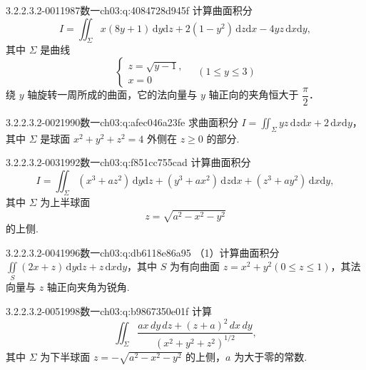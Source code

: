 \par\addvspace{2.4ex}\noindent
\begin{minipage}{\linewidth}

\begin{q}{3.2.2.3.2-001}{1987数一}{ch03:q:4084728d945f}
计算曲面积分
\[
I=\iint_{\Sigma} x(8y+1)\,\mathrm{d}y\mathrm{d}z+2(1-y^{2})\,\mathrm{d}z\mathrm{d}x-4yz\,\mathrm{d}x\mathrm{d}y,
\]
其中 $\Sigma$ 是曲线
\[
\begin{cases}
z=\sqrt{y-1},\\
x=0
\end{cases}\quad (1\leqslant y\leqslant 3)
\]
绕 $y$ 轴旋转一周所成的曲面，它的法向量与 $y$ 轴正向的夹角恒大于 $\dfrac{\pi}{2}$．
\end{q}
\end{minipage}


\begin{q}{3.2.2.3.2-002}{1990数一}{ch03:q:afec046a23fe}
求曲面积分 $\displaystyle I=\iint_{\Sigma} yz\,\mathrm{d}z\mathrm{d}x+2\,\mathrm{d}x\mathrm{d}y$，其中 $\Sigma$ 是球面 $x^2+y^2+z^2=4$ 外侧在 $z\geqslant 0$ 的部分.
\end{q}

\begin{q}{3.2.2.3.2-003}{1992数一}{ch03:q:f851cc755cad}
计算曲面积分 \[ I=\iint_{\Sigma}(x^3+az^2)\,\mathrm{d}y\mathrm{d}z+(y^3+ax^2)\,\mathrm{d}z\mathrm{d}x+(z^3+ay^2)\,\mathrm{d}x\mathrm{d}y, \] 其中 $\Sigma$ 为上半球面 \[ z=\sqrt{a^2-x^2-y^2} \] 的上侧.
\end{q}

\begin{q}{3.2.2.3.2-004}{1996数一}{ch03:q:db6118e86a95}
（1）计算曲面积分 $\displaystyle \iint\limits_{S}(2x+z)\,\mathrm{d}y\mathrm{d}z+z\,\mathrm{d}x\mathrm{d}y$，其中 $S$ 为有向曲面 $z=x^{2}+y^{2}(0\leqslant z\leqslant 1)$，其法向量与 $z$ 轴正向夹角为锐角.
\end{q}

\begin{q}{3.2.2.3.2-005}{1998数一}{ch03:q:b9867350e01f}
计算 \[\iint_{\Sigma}\frac{ax\,dy\,dz+(z+a)^2\,dx\,dy}{(x^2+y^2+z^2)^{1/2}},\] 其中 $\Sigma$ 为下半球面 $z=-\sqrt{a^2-x^2-y^2}$ 的上侧，$a$ 为大于零的常数.
\end{q}

